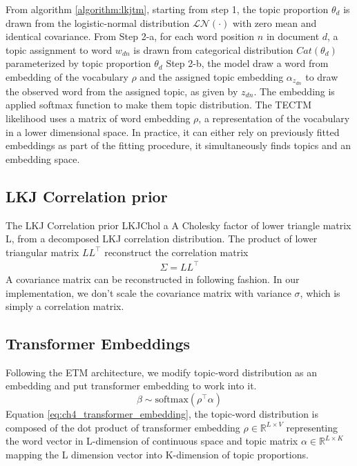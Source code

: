 From algorithm \ref{algorithm:lkjtm}, starting from step 1, the topic proportion $ \theta_d $ is drawn from the logistic-normal distribution $ \mathcal{LN}(\cdot) $ with zero mean and identical covariance.
From Step 2-a, for each word position $ n $ in document $ d $, a topic assignment to word $ w_{dn} $ is drawn from categorical distribution $ Cat(\theta_d) $ parameterized by topic proportion $ \theta_d $
Step 2-b, the model draw a word from embedding of the vocabulary $ \rho $ and the assigned topic embedding $ \alpha_{z_{dn}} $ to draw the observed word from the assigned topic, as given by $ z_{dn} $. The embedding is applied softmax function to make them topic distribution.
The TECTM likelihood uses a matrix of word embedding $ \rho $, a representation of the vocabulary in a lower dimensional space. In practice, it can either rely on previously fitted embeddings as part of the fitting procedure, it simultaneously finds topics and an embedding space.
\subsection{LKJ Correlation prior}
The LKJ Correlation prior LKJChol a A Cholesky factor of lower triangle matrix L, from a decomposed LKJ correlation distribution. The product of lower triangular matrix $ LL^\top $ reconstruct the correlation matrix
\begin{align*}
\Sigma = LL^\top
\end{align*}
A covariance matrix can be reconstructed in following fashion.
In our implementation, we don't scale the covariance matrix with variance $ \sigma $, which is simply a correlation matrix.
\subsection{Transformer Embeddings}
Following the ETM architecture, we modify topic-word distribution as an embedding and put transformer embedding to work into it. 
\begin{equation}\label{eq:ch4_transformer_embedding}
\beta\sim\text{softmax}(\rho^\top\alpha)
\end{equation}
Equation \ref{eq:ch4_transformer_embedding}, the topic-word distribution is composed of the dot product of transformer embedding $ \rho\in\mathbb{R}^{L\times V} $ representing the word vector in L-dimension of continuous space and topic matrix $ \alpha\in\mathbb{R}^{L\times K} $ mapping the L dimension vector into K-dimension of topic proportions.
